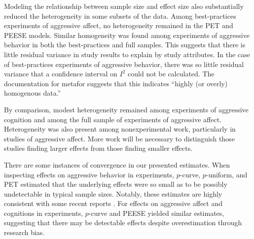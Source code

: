 \documentclass[man, mask]{apa6}
\begin{document}
Modeling the relationship between sample size and effect size also substantially reduced the heterogeneity in some subsets of the data. Among best-practices experiments of aggressive affect, no heterogeneity remained in the PET and PEESE models. Similar homogeneity was found among experiments of aggressive behavior in both the best-practices and full samples. This suggests that there is little residual variance in study results to explain by study attributes. In the case of best-practices experiments of aggressive behavior, there was so little residual variance that a confidence interval on $I^2$ could not be calculated. The documentation for metafor suggests that this indicates ``highly (or overly) homogenous data.'' \citep[, helpfile for confint.rma.uni]{Veichtbauer:2010}

By comparison, modest heterogeneity remained among experiments of aggressive cognition and among the full sample of experiments of aggressive affect. Heterogeneity was also present among nonexperimental work, particularly in studies of aggressive affect. More work will be necessary to distinguish those studies finding larger effects from those finding smaller effects.



There are some instances of convergence in our presented estimates. When inspecting effects on aggressive behavior in experiments, $p$-curve, $p$-uniform, and PET estimated that the underlying effects were so small as to be possibly undetectable in typical sample sizes. Notably, these estimates are highly consistent with some recent reports \citep{Engelhardt:etal:2015,Kneer:etal:inpress,Tear:Nielsen:2014,Przybylski:etal:2014}. For effects on aggressive affect and cognitions in experiments, $p$-curve and PEESE yielded similar estimates, suggesting that there may be detectable effects despite overestimation through research bias. 

\end{document}
